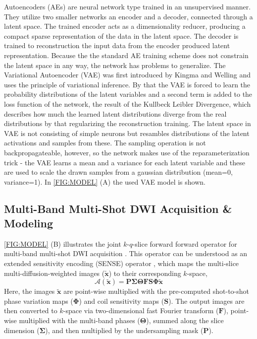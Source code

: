 \documentclass[journal,twoside,web]{ieeecolor}
\begin{document}
	Autoencoders (AEs) are neural network type trained in an unsupervised manner. 
	They utilize two smaller networks an encoder and a decoder, connected through a latent space. 
	The trained encoder acts as a dimensionality reducer, producing a compact sparse representation of the data in the latent space.
	The decoder is trained to reconstruction the input data from the encoder produced latent representation. 
	Because the the standard AE training scheme does not constrain the latent space in any way, the network has problems to generalize.
	The Variational Autoencoder (VAE) was first introduced by Kingma and Welling \cite{kingma_2014_vae} and uses the principle of variational inference. 
	By that the VAE is forced to learn the probability distributions of the latent variables and a second term is 
	added to the loss function of the network, the result of the Kullbeck Leibler Divergence, which describes how much the 
	learned latent distributions diverge from the real distributions by that regularizing the reconstruction training. 
	The latent space in VAE is not consisting of simple neurons but 
	resambles distributions of the latent activations and samples from these. 
	The sampling operation is not backpropagateable, however, 
	so the network makes use of the reparameterization trick - 
	the VAE learns a mean and a variance for each latent variable 
	and these are used to scale the drawn samples from a gaussian distribution (mean=0, variance=1).
	In \cref{FIG:MODEL} (A) the used VAE model is shown.

	\subsection{Multi-Band Multi-Shot DWI Acquisition \& Modeling}

	\cref{FIG:MODEL} (B) illustrates the joint $k$-$q$-slice forward forward operator
	for multi-band multi-shot DWI acquisition \cite{tan_2024_naviepi}.
	This operator can be understood as
	an extended sensitivity encoding (SENSE) operator \cite{pruessmann_2001_gsense},
	which maps the multi-slice multi-diffusion-weighted images ($\mathbf{\tilde{x}}$)
	to their corresponding $k$-space,
	\begin{equation}
		\mathcal{A}(\mathbf{\tilde{x}}) = \mathbf{P \Sigma \Theta F S \Phi} \mathbf{\tilde{x}}
		\label{EQU:FWD}
	\end{equation}
	Here, the images $\mathbf{\tilde{x}}$ are point-wise multiplied
	with the pre-computed shot-to-shot phase variation maps ($\mathbf{\Phi}$)
	and coil sensitivity maps ($\mathbf{S}$).
	The output images are then converted to $k$-space
	via two-dimensional fast Fourier transform ($\mathbf{F}$),
	point-wise multiplied with the multi-band phases ($\mathbf{\Theta}$),
	summed along the slice dimension ($\mathbf{\Sigma}$),
	and then multiplied by the undersampling mask ($\mathbf{P}$).
\end{document}
